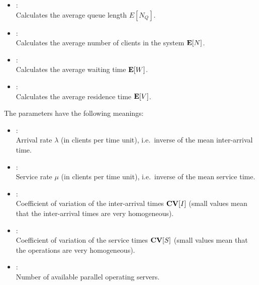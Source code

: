 \begin{itemize}

\item
{}:\\
Calculates the average queue length $E[N_Q]$. 

\item
{}:\\
Calculates the average number of clients in the system ${\bf E}[N]$.

\item
{}:\\
Calculates the average waiting time ${\bf E}[W]$.

\item
{}:\\
Calculates the average residence time ${\bf E}[V]$.
\end{itemize}

The parameters have the following meanings:
\begin{itemize}
\item
{}:\\
Arrival rate $\lambda$ (in clients per time unit), i.e.\ inverse of the mean inter-arrival time.
\item
{}:\\
Service rate $\mu$ (in clients per time unit), i.e.\ inverse of the mean service time.
\item
{}:\\
Coefficient of variation of the inter-arrival times ${\bf CV}[I]$ (small values mean that the inter-arrival times are very homogeneous).
\item
{}:\\
Coefficient of variation of the service times ${\bf CV}[S]$ (small values mean that the operations are very homogeneous).
\item
{}:\\
Number of available parallel operating servers.
\end{itemize}
